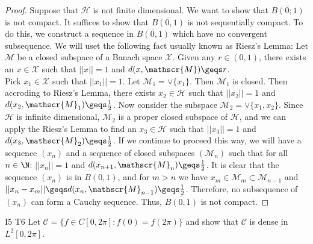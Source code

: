 \begin{proof}
    Suppose that $\mathscr{H}$ is not finite dimensional.
    We want to show that $\overline{B(0;1)}$ is not compact. 
    It suffices to show that $\overline{B(0,1)}$ is not sequentially compact.
    To do this, we construct a sequence in $\overline{B(0,1)}$ which have no convergent subsequence.
    We will uset the following fact usually known as Riesz's Lemma:
    Let $\mathscr{M}$ be a closed subspace of a Banach space $\mathscr{X}$. Given any $r\in (0,1)$, 
    there exists an $x\in\mathscr{X}$ such that $||x||=1$ and $d(x,\mathscr{M})\geqs r$.
    \\
    Pick $x_1\in\mathscr{X}$ such that $||x_1||=1$. Let $\mathscr{M}_1=\vee \{x_1\}$. Then $\mathscr{M}_1$ is closed.
    Then accroding to Riesz's Lemma, there exists $x_2\in \mathscr{H}$ such that $||x_2||=1$ and $d(x_2,\mathscr{M}_1)\geqs \frac{1}{2}$.
    Now consider the subspace $\mathscr{M}_2=\vee\{x_1, x_2\}$. Since $\mathscr{H}$ is infinite dimensional,
    $\mathscr{M}_2$ is a proper closed subspace of $\mathscr{H}$, and we can apply the Riesz's Lemma to find
    an $x_3 \in \mathscr{H}$ such that $||x_3||=1$ and $d(x_3,\mathscr{M}_2)\geqs \frac{1}{2}$.
    If we continue to proceed this way, we will have a sequence $(x_n)$ and a sequence of
    closed subspaces $(\mathscr{M}_n)$ such that for all $n \in \N$: $||x_n||=1$ and $d(x_{n+1},\mathscr{M}_n)\geqs \frac{1}{2}$.
    It is clear that the sequence $(x_n)$ is in $\overline{B(0,1)}$, 
    and for $m>n$ we have $x_m\in \mathscr{M}_m\subset \mathscr{M}_{n-1}$ and $||x_n-x_m||\geqs d(x_n,\mathscr{M}_{n-1})\geqs \frac{1}{2}$.
    Therefore, no subsequence of $(x_n)$ can form a Cauchy sequence. 
    Thus, $\overline{B(0, 1)}$ is not compact.
\end{proof}

\begin{exercise}{I5 T6}{}
    Let $\mathscr{C}=\{f\in C[0,2\pi]: f(0)=f(2\pi)\}$ and show that $\mathscr{C}$ is dense in $L^2[0,2\pi]$.
\end{exercise}

